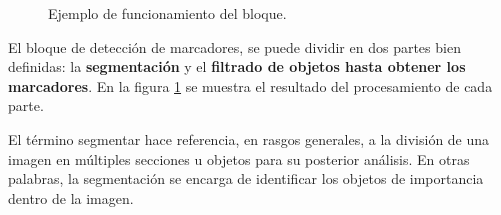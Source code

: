 \begin{figure}[H]
        \centering
         

  \caption{Ejemplo de funcionamiento del bloque.}
      \label{ejemplotodointro}
\end{figure}

El bloque de detección de marcadores, se puede dividir en dos partes bien definidas: la \textbf{segmentación} y el \textbf{filtrado de objetos hasta obtener los marcadores}. En la figura \ref{ejemplotodointro} se muestra el resultado del procesamiento de cada parte.

El término segmentar hace referencia, en rasgos generales, a la división de una imagen en múltiples secciones u objetos para su posterior análisis. En otras palabras, la segmentación se encarga de identificar los objetos de importancia dentro de la imagen. 

